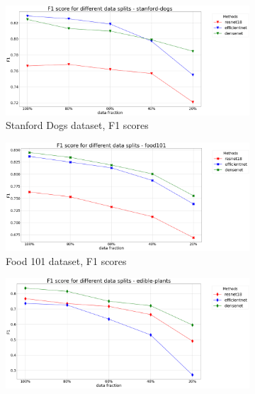 \begin{figure}[h]
  \centering
 \begin{subfigure}{.45\textwidth}
    \centering
    \includegraphics[width=\textwidth]{experiments/models/stanford-dogs-f1.png}
    \caption{Stanford Dogs dataset, F1 scores}\label{fig:model-scores-dogs}
\end{subfigure}
 \begin{subfigure}{.45\textwidth}
    \centering
    \includegraphics[width=\textwidth]{experiments/models/food101-f1.png}
    \caption{Food 101 dataset, F1 scores}\label{fig:model-scores-food101}
\end{subfigure}
 \begin{subfigure}{.45\textwidth}
    \centering
    \includegraphics[width=\textwidth]{experiments/models/edible-plants-f1.png}

\end{subfigure}
\end{figure}
